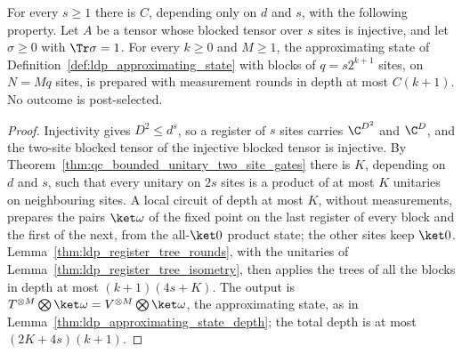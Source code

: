 \begin{lemma}
    \label{thm:ldp_register_tree_approximating_state}
    \leanok
    For every $s\ge1$ there is $C$, depending only on $d$ and $s$, with the
    following property. Let $A$ be a tensor whose blocked tensor over $s$ sites
    is injective, and let $\sigma\ge0$ with $\Tr\sigma=1$. For every $k\ge0$
    and $M\ge1$, the approximating state of
    Definition~\ref{def:ldp_approximating_state} with blocks of $q=s2^{k+1}$
    sites, on $N=Mq$ sites, is prepared with measurement rounds in depth at most
    $C(k+1)$. No outcome is post-selected.
\end{lemma}
\begin{proof}
    \leanok
    Injectivity gives $D^2\le d^s$, so a register of $s$ sites carries
    $\C^{D^2}$ and $\C^D$, and the two-site blocked tensor of the injective
    blocked tensor is injective. By
    Theorem~\ref{thm:qc_bounded_unitary_two_site_gates} there is $K$,
    depending on $d$ and $s$, such that every unitary on $2s$ sites is a
    product of at most $K$ unitaries on neighbouring sites. A local circuit of
    depth at most $K$, without measurements, prepares the pairs
    $\ket\omega$ of the fixed point on the last register of every block and the
    first of the next, from the all-$\ket0$ product state; the other sites keep
    $\ket0$. Lemma~\ref{thm:ldp_register_tree_rounds}, with the unitaries of
    Lemma~\ref{thm:ldp_register_tree_isometry}, then applies the trees of all
    the blocks in depth at most $(k+1)(4s+K)$. The output is
    $T^{\otimes M}\bigotimes\ket\omega=V^{\otimes M}\bigotimes\ket\omega$, the
    approximating state, as in Lemma~\ref{thm:ldp_approximating_state_depth};
    the total depth is at most $(2K+4s)(k+1)$.
\end{proof}

